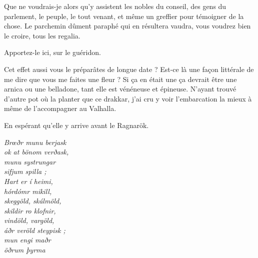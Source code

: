 \begin{drama}
  Que ne voudrais-je alors qu’y assistent les nobles du conseil, des gens du parlement, le peuple, le tout venant, et même un greffier pour témoigner de la chose. Le parchemin dûment paraphé qui en résultera vaudra, vous voudrez bien le croire, tous les regalia.

  \elenaspeaks {} Apportez-le ici, sur le guéridon.


  \reinespeaks Cet effet aussi vous le préparâtes de longue date ? Est-ce là une façon littérale de me dire que vous me faites une fleur ? %
  \elenaspeaks Si ça en était une ça devrait être une arnica ou une belladone, tant elle est  vénéneuse et épineuse. N’ayant trouvé d’autre pot où la planter que ce drakkar, j’ai cru y voir l’embarcation la mieux à même de l’accompagner au Valhalla.


  En espérant qu’elle y arrive avant le Ragnarök.



  \choirspeaks
  \begin{minipage}[t]{\linewidth}
    \em
    Brœðr munu berjask\endnote{\ragnarokendnote}\\
    ok at bönom verðask,\\
    munu systrungar\\
    sifjum spilla ;\\
    Hart er í heimi,\\
    hórdómr mikill,\\
    skeggöld, skálmöld,\\
    skildir ro klofnir,\\
    vindöld, vargöld,\\
    áðr veröld steypisk ;\\
    mun engi maðr\\
    öðrum þyrma
  \end{minipage}
\end{drama}

\scene

\StageDirII{\elena, \ela}


